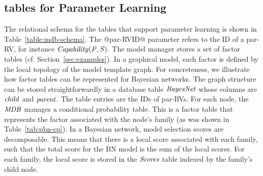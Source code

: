 
\subsection{\MDB tables for Parameter Learning}
The relational schema for the tables that support parameter learning is shown in Table~\ref{table:mdb-schema}. The @par-RVID@ parameter refers to the ID  of a par-RV, for instance $\it{Capability}(\P,\S)$.
The model manager stores a set of factor tables (cf. Section~\ref{sec:examples}). In a graphical model, each factor is defined by the local topology of the model template graph. For concreteness, we illustrate how factor tables can be represented  for Bayesian networks. The graph structure can be stored straightforwardly in a database table $\it{BayesNet}$ whose columns are $\it{child}$ and $\it{parent}$. The table entries are the IDs of par-RVs. 
For each node, the $\MDB$ manages a conditional probability table. This is a factor table that represents the factor associated with the node's family (as was shown in Table~\ref{tab:pbn-cp}).
%
%
In a Bayesian network, model selection scores are decomposable. This means that there is a local score associated with each family, such that the total score for the BN model is the sum of the local scores. For each family, the local score is stored in the $\it{Scores}$ table indexed by the family's child node.


